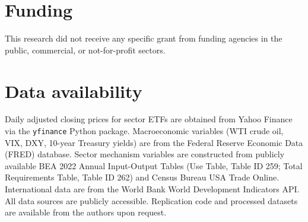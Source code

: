 \documentclass[12pt,preprint,authoryear]{elsarticle}
\begin{document}
\section*{Funding}
This research did not receive any specific grant from funding agencies in the public, commercial, or not-for-profit sectors.

\section*{Data availability}
Daily adjusted closing prices for sector ETFs are obtained from Yahoo Finance via the \texttt{yfinance} Python package. Macroeconomic variables (WTI crude oil, VIX, DXY, 10-year Treasury yields) are from the Federal Reserve Economic Data (FRED) database. Sector mechanism variables are constructed from publicly available BEA 2022 Annual Input-Output Tables (Use Table, Table ID 259; Total Requirements Table, Table ID 262) and Census Bureau USA Trade Online. International data are from the World Bank World Development Indicators API. All data sources are publicly accessible. Replication code and processed datasets are available from the authors upon request.


\end{document}
